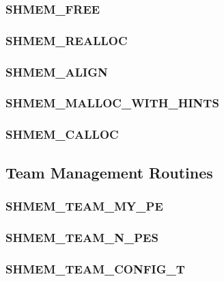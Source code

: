 \documentclass[10pt,oneside]{book}
\begin{document}
\subsubsection{\textbf{SHMEM\_FREE}}\label{subsec:shmem_free}


\subsubsection{\textbf{SHMEM\_REALLOC}}\label{subsec:shmem_realloc}


\subsubsection{\textbf{SHMEM\_ALIGN}}\label{subsec:shmem_align}


\subsubsection{\textbf{SHMEM\_MALLOC\_WITH\_HINTS}}\label{subsec:shmmallochint}


\subsubsection{\textbf{SHMEM\_CALLOC}}\label{subsec:shmem_calloc}




\subsection{Team Management Routines}\label{subsec:team}


\subsubsection{\textbf{SHMEM\_TEAM\_MY\_PE}}\label{subsec:shmem_team_my_pe}


\subsubsection{\textbf{SHMEM\_TEAM\_N\_PES}}\label{subsec:shmem_team_n_pes}


\subsubsection{\textbf{SHMEM\_TEAM\_CONFIG\_T}}
\label{subsec:shmem_team_config_t}

\end{document}
